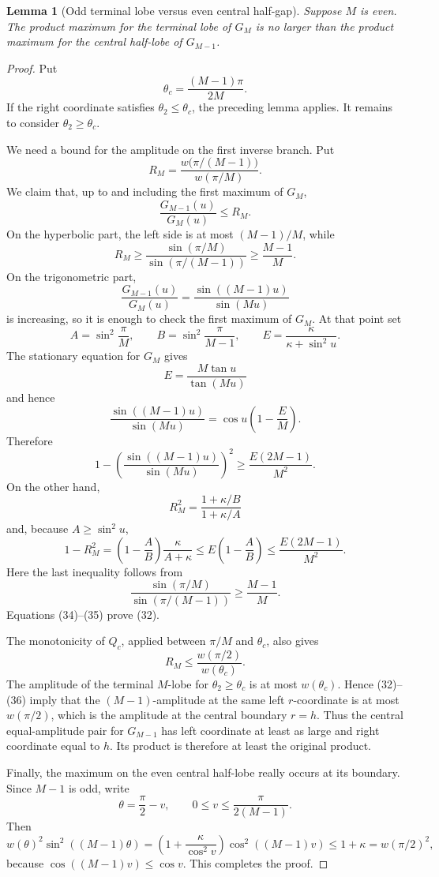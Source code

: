 \documentclass[11pt]{article}
\newtheorem{lemma}{Lemma}
\begin{document}
\begin{lemma}[Odd terminal lobe versus even central half-gap]
Suppose \(M\) is even. The product maximum for the terminal lobe of \(G_M\)
is no larger than the product maximum for the central half-lobe of
\(G_{M-1}\).
\end{lemma}

\begin{proof}
Put
\[
\theta_c=\frac{(M-1)\pi}{2M}.
\]
If the right coordinate satisfies \(\theta_2\leq\theta_c\), the preceding
lemma applies. It remains to consider \(\theta_2\geq\theta_c\).

We need a bound for the amplitude on the first inverse branch. Put
\[
R_M=
\frac{w\bigl(\pi/(M-1)\bigr)}{w(\pi/M)}.
\tag{31}
\]
We claim that, up to and including the first maximum of \(G_M\),
\[
\frac{G_{M-1}(u)}{G_M(u)}\leq R_M.
\tag{32}
\]
On the hyperbolic part, the left side is at most \((M-1)/M\), while
\[
R_M\geq
\frac{\sin(\pi/M)}{\sin(\pi/(M-1))}
\geq\frac{M-1}{M}.
\tag{33}
\]
On the trigonometric part,
\[
\frac{G_{M-1}(u)}{G_M(u)}
 =\frac{\sin((M-1)u)}{\sin(Mu)}
\]
is increasing, so it is enough to check the first maximum of \(G_M\). At that
point set
\[
A=\sin^2\frac{\pi}{M},
\qquad
B=\sin^2\frac{\pi}{M-1},
\qquad
E=\frac{\kappa}{\kappa+\sin^2u}.
\]
The stationary equation for \(G_M\) gives
\[
E=\frac{M\tan u}{\tan(Mu)}
\]
and hence
\[
\frac{\sin((M-1)u)}{\sin(Mu)}
 =\cos u\left(1-\frac EM\right).
\]
Therefore
\[
1-
\left(\frac{\sin((M-1)u)}{\sin(Mu)}\right)^2
 \geq \frac{E(2M-1)}{M^2}.
\tag{34}
\]
On the other hand,
\[
R_M^2=\frac{1+\kappa/B}{1+\kappa/A}
\]
and, because \(A\geq\sin^2u\),
\[
1-R_M^2
 =\left(1-\frac AB\right)\frac{\kappa}{A+\kappa}
 \leq E\left(1-\frac AB\right)
 \leq\frac{E(2M-1)}{M^2}.
\tag{35}
\]
Here the last inequality follows from
\[
\frac{\sin(\pi/M)}{\sin(\pi/(M-1))}
 \geq\frac{M-1}{M}.
\]
Equations (34)--(35) prove (32).

The monotonicity of \(Q_c\), applied between \(\pi/M\) and \(\theta_c\),
also gives
\[
R_M\leq\frac{w(\pi/2)}{w(\theta_c)}.
\tag{36}
\]
The amplitude of the terminal \(M\)-lobe for
\(\theta_2\geq\theta_c\) is at most \(w(\theta_c)\). Hence (32)--(36) imply
that the \((M-1)\)-amplitude at the same left \(r\)-coordinate is at most
\(w(\pi/2)\), which is the amplitude at the central boundary \(r=h\).
Thus the central equal-amplitude pair for \(G_{M-1}\) has left coordinate at
least as large and right coordinate equal to \(h\). Its product is therefore
at least the original product.

Finally, the maximum on the even central half-lobe really occurs at its
boundary. Since \(M-1\) is odd, write
\[
\theta=\frac{\pi}{2}-v,
\qquad
0\leq v\leq\frac{\pi}{2(M-1)}.
\]
Then
\[
w(\theta)^2\sin^2((M-1)\theta)
 =\left(1+\frac{\kappa}{\cos^2v}\right)
   \cos^2((M-1)v)
 \leq 1+\kappa=w(\pi/2)^2,
\]
because \(\cos((M-1)v)\leq\cos v\). This completes the proof.
\end{proof}
\end{document}

